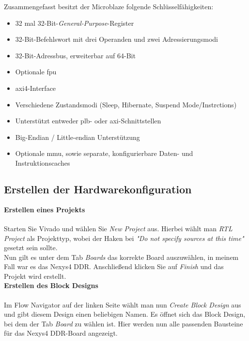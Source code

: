 Zusammengefasst besitzt der Microblaze folgende Schlüsselfähigkeiten:
\begin{itemize}
  \item 32 mal 32-Bit-\emph{General-Purpose}-Register
  \item 32-Bit-Befehlswort mit drei Operanden und zwei Adressierungsmodi
  \item 32-Bit-Adressbus, erweiterbar auf 64-Bit
  \item Optionale \ac{fpu}
  \item \ac{axi}4-Interface
  \item Verschiedene Zustandsmodi (Sleep, Hibernate, Suspend Mode/Instrctions)
  \item Unterstützt entweder \ac{plb}- oder \ac{axi}-Schnittstellen
  \item Big-Endian / Little-endian Unterstützung
  \item Optionale \ac{mmu}, sowie separate, konfigurierbare Daten- und Instruktionscaches
\end{itemize}


\subsection{Erstellen der Hardwarekonfiguration}\label{kap:microblazehardware}


\textbf{Erstellen eines Projekts}\\\\
Starten Sie Vivado und wählen Sie \emph{New Project} aus.
Hierbei wählt man \emph{RTL Project} als Projekttyp, wobei der Haken bei \emph{"Do not specify sources at this time"} gesetzt sein sollte.\\
Nun gilt es unter dem Tab \emph{Boards} das korrekte Board auszuwählen, in meinem Fall war es das Nexys4 DDR.
Anschließend klicken Sie auf \emph{Finish} und das Projekt wird erstellt.\\


\newpage
\textbf{Erstellen des Block Designs}\\\\
Im Flow Navigator  auf der linken Seite wählt man nun \emph{Create Block Design} aus und
 gibt diesem Design einen beliebigen Namen.
Es öffnet sich das Block Design, bei dem der Tab \emph{Board} zu wählen ist. Hier werden nun
alle passenden Bausteine für das Nexys4 DDR-Board angezeigt.\\\\

